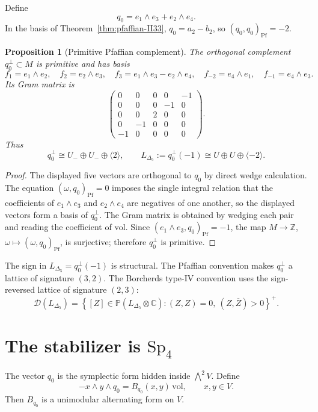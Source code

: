 \documentclass[11pt]{article}
\providecommand{\Z}{\mathbb{Z}}
\providecommand{\C}{\mathbb{C}}
\providecommand{\Sp}{\mathrm{Sp}}
\theoremstyle{plain}
\newtheorem{proposition}[theorem]{Proposition}
\theoremstyle{definition}
\begin{document}
Define
\[
q_0=e_1\wedge e_3+e_2\wedge e_4.
\]
In the basis of Theorem~\ref{thm:pfaffian-II33}, $q_0=a_2-b_2$, so
$(q_0,q_0)_{\mathrm{Pf}}=-2$.

\begin{proposition}[Primitive Pfaffian complement]
\label{prop:primitive-complement}
The orthogonal complement $q_0^\perp\subset M$ is primitive and has
basis
\[
f_1=e_1\wedge e_2,\quad
f_2=e_2\wedge e_3,\quad
f_3=e_1\wedge e_3-e_2\wedge e_4,\quad
f_{-2}=e_4\wedge e_1,\quad
f_{-1}=e_4\wedge e_3 .
\]
Its Gram matrix is
\[
\begin{pmatrix}
0&0&0&0&-1\\
0&0&0&-1&0\\
0&0&2&0&0\\
0&-1&0&0&0\\
-1&0&0&0&0
\end{pmatrix}.
\]
Thus
\[
q_0^\perp\cong U_-\oplus U_-\oplus\langle 2\rangle,
\qquad
L_{\Delta_5}:=q_0^\perp(-1)\cong U\oplus U\oplus\langle -2\rangle .
\]
\end{proposition}

\begin{proof}
The displayed five vectors are orthogonal to $q_0$ by direct wedge
calculation.  The equation $(\omega,q_0)_{\mathrm{Pf}}=0$ imposes the
single integral relation that the coefficients of
$e_1\wedge e_3$ and $e_2\wedge e_4$ are negatives of one another, so
the displayed vectors form a basis of $q_0^\perp$.  The Gram matrix is
obtained by wedging each pair and reading the coefficient of
$\mathrm{vol}$.  Since $(e_1\wedge e_3,q_0)_{\mathrm{Pf}}=-1$, the map
$M\to\Z$, $\omega\mapsto(\omega,q_0)_{\mathrm{Pf}}$, is surjective;
therefore $q_0^\perp$ is primitive.
\end{proof}

The sign in $L_{\Delta_5}=q_0^\perp(-1)$ is structural.  The Pfaffian
convention makes $q_0^\perp$ a lattice of signature $(3,2)$.
The Borcherds type-IV convention uses the sign-reversed lattice of
signature $(2,3)$:
\[
\mathcal D(L_{\Delta_5})
=\left\{[Z]\in\mathbb P(L_{\Delta_5}\otimes\C):
(Z,Z)=0,\ (Z,\overline Z)>0\right\}^{+}.
\]

\section{\texorpdfstring{The stabilizer is $\Sp_4$}{The stabilizer is Sp4}}

The vector $q_0$ is the symplectic form hidden inside
$\bigwedge^2 V$.  Define
\[
-x\wedge y\wedge q_0
=B_{q_0}(x,y)\,\mathrm{vol},
\qquad x,y\in V.
\]
Then $B_{q_0}$ is a unimodular alternating form on $V$.
\end{document}
